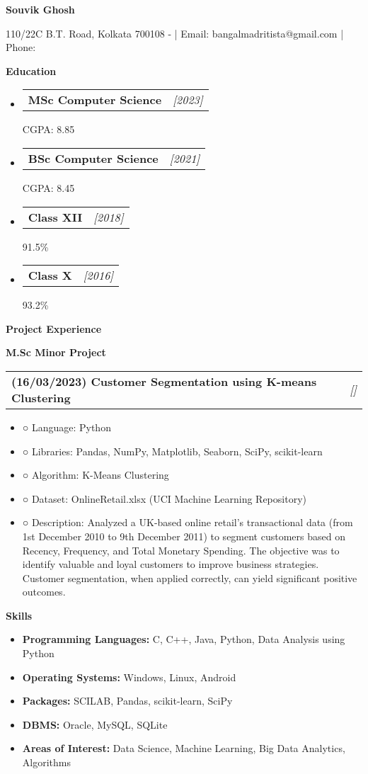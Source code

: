 \documentclass[a4paper,10pt]{article}
\makeatletter
\newcommand{\resitem}[1]{\item #1}
\newcommand{\resheading}[1]{\vspace{0.5em} {\small \colorbox{mygrey}{{\begin{minipage}{0.975\textwidth}{{\textbf{#1}}}\end{minipage}}}} \vspace{0.5em}}
\newcommand{\ressubheading}[3]{\begin{tabular*}{6.62in}{l @{\extracolsep{\fill}} r} \textbf{#1} & \textit{[#2]} \\ \end{tabular*}\vspace{-8pt}}
\makeatother
\begin{document}
\begin{center} \Large{\textbf{Souvik Ghosh}} \end{center}

\vspace{2pt}

\begin{center} 110/22C B.T. Road, Kolkata 700108 - | Email: bangalmadritista@gmail.com | Phone: \end{center}

\resheading{Education}
\begin{itemize}[noitemsep]
    \resitem{\ressubheading{MSc Computer Science}{2023}{Banaras Hindu University, Varanasi} CGPA: 8.85}
    \resitem{\ressubheading{BSc Computer Science}{2021}{Scottish Church College, University of Calcutta, Kolkata} CGPA: 8.45}
    \resitem{\ressubheading{Class XII}{2018}{Central Modern School, Council for the Indian School Certificate Examinations} 91.5\%}
    \resitem{\ressubheading{Class X}{2016}{Central Modern School, Council for the Indian School Certificate Examinations} 93.2\%}
\end{itemize}

\resheading{Project Experience}
\resheading{M.Sc Minor Project}
\ressubheading{(16/03/2023) Customer Segmentation using K-means Clustering}{}{ }
\begin{itemize}[noitemsep]
    \resitem{○ Language: Python}
    \resitem{○ Libraries: Pandas, NumPy, Matplotlib, Seaborn, SciPy, scikit-learn}
    \resitem{○ Algorithm: K-Means Clustering}
    \resitem{○ Dataset: OnlineRetail.xlsx (UCI Machine Learning Repository)}
    \resitem{○ Description: Analyzed a UK-based online retail’s transactional data (from 1st December 2010 to 9th December 2011) to segment customers based on Recency, Frequency, and Total Monetary Spending.  The objective was to identify valuable and loyal customers to improve business strategies.  Customer segmentation, when applied correctly, can yield significant positive outcomes.}
\end{itemize}


\resheading{Skills}
\begin{itemize}[noitemsep]
    \resitem{\textbf{Programming Languages:} C, C++, Java, Python, Data Analysis using Python}
    \resitem{\textbf{Operating Systems:} Windows, Linux, Android}
    \resitem{\textbf{Packages:} SCILAB, Pandas, scikit-learn, SciPy}
    \resitem{\textbf{DBMS:} Oracle, MySQL, SQLite}
    \resitem{\textbf{Areas of Interest:} Data Science, Machine Learning, Big Data Analytics, Algorithms}
\end{itemize}
\end{document}
